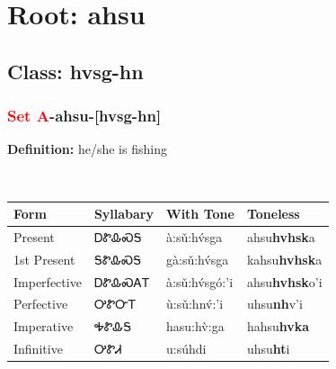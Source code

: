 \needspace{4in}
\section*{Root: ahsu}
\nopagebreak
{}
\needspace{3in}
\subsection*{Class: hvsg-hn}
\nopagebreak
\needspace{2in}
\subsubsection*{\textcolor{Red}{Set A}{-}\textbf{ahsu}{-}[hvsg-hn]}
\nopagebreak
\textbf{Definition: } he/she is fishing
\\[0.5em]
\begin{tabularx}{\textwidth}{l X X X}%
\toprule%
\textbf{Form}&\textbf{Syllabary}&\textbf{With Tone}&\textbf{Toneless}\\%
\midrule%
Present&ᎠᏑᎲᏍᎦ&à:sǔ:hv́sga&ahsu\textbf{hvhsk}a\\%
1st Present&ᎦᏑᎲᏍᎦ&gà:sǔ:hv́sga&kahsu\textbf{hvhsk}a\\%
Imperfective&ᎠᏑᎲᏍᎪᎢ&à:sǔ:hv́sgó:’i&ahsu\textbf{hvhsk}o'i\\%
Perfective&ᎤᏑᏅᎢ&ù:sǔ:hnv́:’i&uhsu\textbf{nh}v'i\\%
Imperative&ᎭᏑᎲᎦ&hasu:hv̀:ga&hahsu\textbf{hvka}\\%
Infinitive&ᎤᏑᏗ&u:súhdi&uhsu\textbf{ht}i\\%
\bottomrule%
\end{tabularx}
\\[1em]